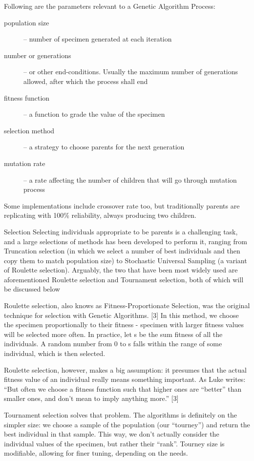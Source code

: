 Following are the parameters relevant to a Genetic Algorithm Process:
\begin{description}
    \item[population size] -- number of specimen generated at each iteration
    \item[number or generations] -- or other end-conditions. Usually the maximum number of generations allowed, after which the process shall end
    \item[fitness function] -- a function to grade the value of the specimen
    \item[selection method] -- a strategy to choose parents for the next generation
    \item[mutation rate] -- a rate affecting the number of children that will go through mutation process
\end{description}
Some implementations include crossover rate too, but traditionally parents are replicating with 100\% reliability, always producing two children.

Selection Selecting individuals appropriate to be parents is a challenging task, and a large selections of methods has been developed to perform it, ranging from Truncation selection (in which we select a number of best individuals and then copy them to match population size) to Stochastic Universal Sampling (a variant of Roulette selection). Arguably, the two that have been most widely used are aforementioned Roulette selection and Tournament selection, both of which will be discussed below

Roulette selection, also knows as Fitness-Proportionate Selection, was the original technique for selection with Genetic Algorithms. [3] In this method, we choose the specimen proportionally to their fitness - specimen with larger fitness values will be selected more often. In practice, let s be the sum fitness of all the individuals. A random number from 0 to s falls within the range of some individual, which is then selected.

Roulette selection, however, makes a big assumption: it presumes that the actual fitness
value of an individual really means something important. As Luke writes: “But often we choose a fitness function such that higher ones are “better” than smaller ones, and don’t mean to imply anything more.” [3]

Tournament selection solves that problem. The algorithms is definitely on the simpler size: we choose a sample of the population (our “tourney”) and return the best individual in that sample. This way, we don’t actually consider the individual values of the specimen, but rather their “rank”. Tourney size is modifiable, allowing for finer tuning, depending on the needs.

